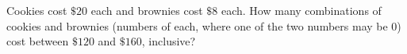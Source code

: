 Cookies cost $\$20$ each and brownies cost $\$8$ each. How many combinations of cookies and brownies (numbers of each, where one of the two numbers may be $0$) cost between $\$120$ and $\$160$, inclusive?
